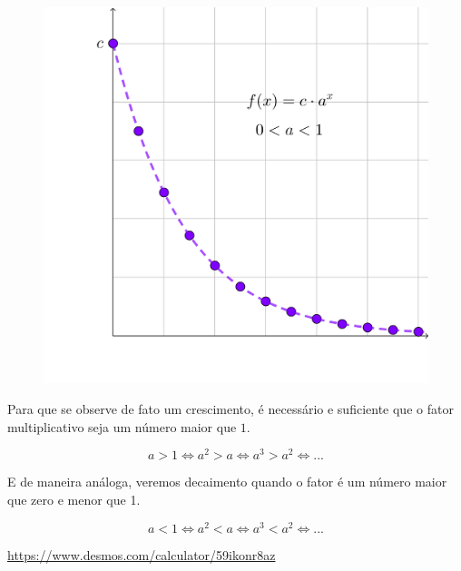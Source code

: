 \clearpage
{
\begin{figure}

\centering
\includegraphics[width=.4\textwidth]{Figuras/exponencial8.png}

\end{figure}

Para que se observe de fato um crescimento, é necessário e suficiente que o fator multiplicativo seja um número maior que $1$.

\begin{equation*}
a > 1 \iff a^2>a \iff a^3>a^2 \iff ...
\end{equation*}

E de maneira análoga, veremos decaimento quando o fator é um número maior que zero e menor que 1.

\begin{equation*}
a<1 \iff a^2<a \iff a^3<a^2 \iff ...
\end{equation*}

\url{https://www.desmos.com/calculator/59ikonr8az}}

